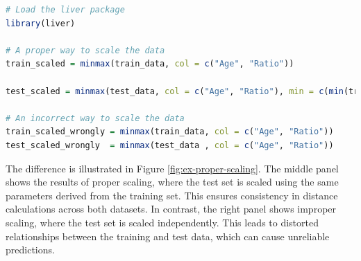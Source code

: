 \documentclass[
]{book}
\theoremstyle{definition}
\theoremstyle{definition}
\theoremstyle{definition}
\theoremstyle{definition}
\theoremstyle{remark}
\begin{document}
\begin{lstlisting}[language=R]
# Load the liver package
library(liver)

# A proper way to scale the data
train_scaled = minmax(train_data, col = c("Age", "Ratio"))

test_scaled = minmax(test_data, col = c("Age", "Ratio"), min = c(min(train_data$Age), min(train_data$Ratio)), max = c(max(train_data$Age), max(train_data$Ratio)))

# An incorrect way to scale the data
train_scaled_wrongly = minmax(train_data, col = c("Age", "Ratio"))
test_scaled_wrongly  = minmax(test_data , col = c("Age", "Ratio"))
\end{lstlisting}

The difference is illustrated in Figure \ref{fig:ex-proper-scaling}. The middle panel shows the results of proper scaling, where the test set is scaled using the same parameters derived from the training set. This ensures consistency in distance calculations across both datasets. In contrast, the right panel shows improper scaling, where the test set is scaled independently. This leads to distorted relationships between the training and test data, which can cause unreliable predictions.
\end{document}
